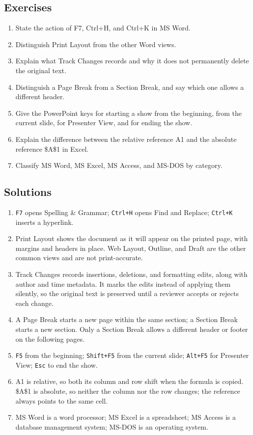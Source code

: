 \documentclass[11pt]{article}
\begin{document}
\subsection*{Exercises}
\begin{enumerate}[label=\arabic*.]
  \item State the action of F7, Ctrl+H, and Ctrl+K in MS Word.
  \item Distinguish Print Layout from the other Word views.
  \item Explain what Track Changes records and why it does not permanently
    delete the original text.
  \item Distinguish a Page Break from a Section Break, and say which one
    allows a different header.
  \item Give the PowerPoint keys for starting a show from the beginning, from
    the current slide, for Presenter View, and for ending the show.
  \item Explain the difference between the relative reference A1 and the
    absolute reference \$A\$1 in Excel.
  \item Classify MS Word, MS Excel, MS Access, and MS-DOS by category.
\end{enumerate}

\subsection*{Solutions}
\begingroup\small
\begin{enumerate}[label=\arabic*.]
  \item \texttt{F7} opens Spelling \& Grammar; \texttt{Ctrl+H} opens Find and
    Replace; \texttt{Ctrl+K} inserts a hyperlink.
  \item Print Layout shows the document as it will appear on the printed
    page, with margins and headers in place. Web Layout, Outline, and Draft
    are the other common views and are not print-accurate.
  \item Track Changes records insertions, deletions, and formatting edits,
    along with author and time metadata. It marks the edits instead of
    applying them silently, so the original text is preserved until a
    reviewer accepts or rejects each change.
  \item A Page Break starts a new page within the same section; a Section
    Break starts a new section. Only a Section Break allows a different
    header or footer on the following pages.
  \item \texttt{F5} from the beginning; \texttt{Shift+F5} from the current
    slide; \texttt{Alt+F5} for Presenter View; \texttt{Esc} to end the show.
  \item A1 is relative, so both its column and row shift when the formula is
    copied. \$A\$1 is absolute, so neither the column nor the row changes; the
    reference always points to the same cell.
  \item MS Word is a word processor; MS Excel is a spreadsheet; MS Access is
    a database management system; MS-DOS is an operating system.
\end{enumerate}
\endgroup
\end{document}
